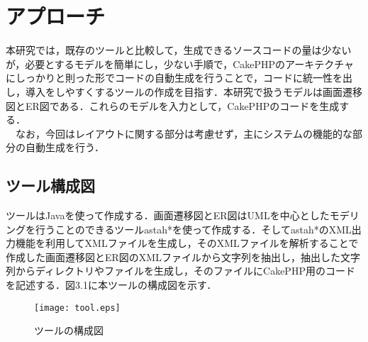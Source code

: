 \documentclass{funthesis}
\begin{document}
\chapter{アプローチ}
本研究では，既存のツールと比較して，生成できるソースコードの量は少ないが，必要とするモデルを簡単にし，少ない手順で，CakePHPのアーキテクチャにしっかりと則った形でコードの自動生成を行うことで，コードに統一性を出し，導入をしやすくするツールの作成を目指す．本研究で扱うモデルは画面遷移図とER図である．これらのモデルを入力として，CakePHPのコードを生成する．\\
　なお，今回はレイアウトに関する部分は考慮せず，主にシステムの機能的な部分の自動生成を行う．

\section{ツール構成図}
ツールはJavaを使って作成する．画面遷移図とER図はUMLを中心としたモデリングを行うことのできるツールastah*\cite{astah}を使って作成する．そしてastah*のXML出力機能を利用してXMLファイルを生成し，そのXMLファイルを解析することで作成した画面遷移図とER図のXMLファイルから文字列を抽出し，抽出した文字列からディレクトリやファイルを生成し，そのファイルにCakePHP用のコードを記述する．図3.1に本ツールの構成図を示す．
\begin{figure}[htpb]
\begin{center}
\texttt{[image: tool.eps]}
\caption{ツールの構成図}
\end{center}
\end{figure}
\end{document}
